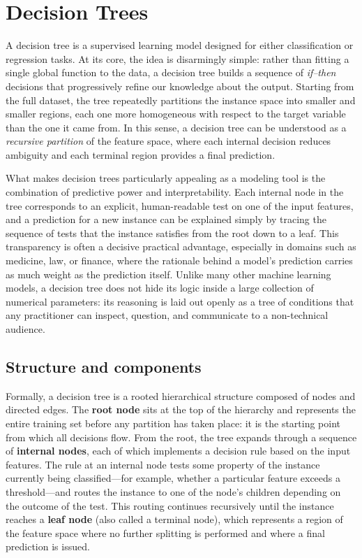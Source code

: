 
\chapter{Decision Trees}

A \alert{decision tree} is a supervised learning model designed for either classification or
regression tasks. At its core, the idea is disarmingly simple: rather than fitting a single
global function to the data, a decision tree builds a sequence of \emph{if--then} decisions
that progressively refine our knowledge about the output. Starting from the full dataset, the
tree repeatedly partitions the instance space into smaller and smaller regions, each one more
homogeneous with respect to the target variable than the one it came from. In this sense, a
decision tree can be understood as a \emph{recursive partition} of the feature space, where
each internal decision reduces ambiguity and each terminal region provides a final prediction.

What makes decision trees particularly appealing as a modeling tool is the combination of
predictive power and interpretability. Each internal node in the tree corresponds to an
explicit, human-readable test on one of the input features, and a prediction for a new
instance can be explained simply by tracing the sequence of tests that the instance satisfies
from the root down to a leaf. This transparency is often a decisive practical advantage,
especially in domains such as medicine, law, or finance, where the rationale behind a
model's prediction carries as much weight as the prediction itself. Unlike many other
machine learning models, a decision tree does not hide its logic inside a large collection
of numerical parameters: its reasoning is laid out openly as a tree of conditions that any
practitioner can inspect, question, and communicate to a non-technical audience.

\section*{Structure and components}

Formally, a decision tree is a rooted hierarchical structure composed of nodes and directed
edges. The \textbf{root node} sits at the top of the hierarchy and represents the entire
training set before any partition has taken place: it is the starting point from which all
decisions flow. From the root, the tree expands through a sequence of \textbf{internal
nodes}, each of which implements a decision rule based on the input features. The rule at an
internal node tests some property of the instance currently being classified---for example,
whether a particular feature exceeds a threshold---and routes the instance to one of the
node's children depending on the outcome of the test. This routing continues recursively
until the instance reaches a \textbf{leaf node} (also called a terminal node), which
represents a region of the feature space where no further splitting is performed and where a
final prediction is issued.


